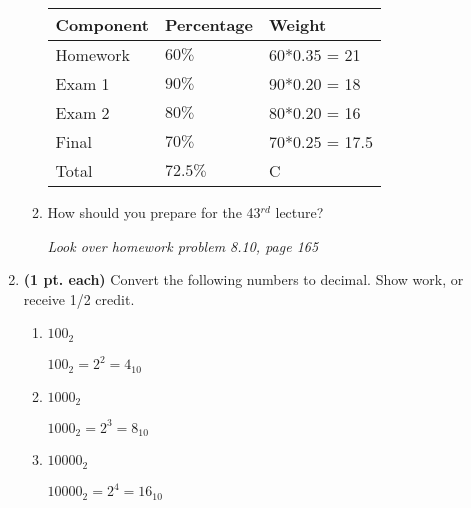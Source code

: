 \begin{enumerate}
\begin{enumerate}
                \begin{onlysolution}
                    \itshape
                    \begin{tabular}{l|l|l}
                        Component & Percentage & Weight \\ \hline \hline
                        Homework & $60\%$    & 60*0.35 = 21\\ \hline
                        Exam 1   & $90\%$    & 90*0.20 = 18\\ \hline
                        Exam 2   & $80\%$    & 80*0.20 = 16\\ \hline
                        Final    & $70\%$    & 70*0.25 = 17.5 \\ \hline
                        Total    & $72.5\%$ & C \\
                    \end{tabular}
                \end{onlysolution}

            \item How should you prepare for the 43$^{rd}$ lecture?

                \begin{onlysolution}
                    \itshape
                    Look over homework problem 8.10, page 165
                \end{onlysolution}

        \end{enumerate}

    \item \textbf{ (1 pt. each)} Convert the following numbers to decimal.
        Show work, or receive 1/2 credit.
        \begin{enumerate}
            \item $100_2$
                \begin{onlysolution}    \itshape $100_2 = 2^2 = 4_{10}$
                \end{onlysolution}

            \item $1000_2$
                \begin{onlysolution}    \itshape $1000_2 = 2^3 = 8_{10}$
                \end{onlysolution}

            \item $10000_2$
                \begin{onlysolution}    \itshape $10000_2 = 2^4 = 16_{10}$
                \end{onlysolution}


\end{enumerate}
\end{enumerate}
